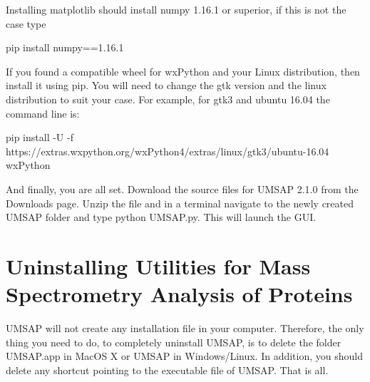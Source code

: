 Installing matplotlib should install numpy 1.16.1 or superior, if this is not the case type

pip install numpy==1.16.1

If you found a compatible wheel for wxPython and your Linux distribution, then install it using pip. You will need to change the gtk version and the linux distribution to suit your case. For example, for gtk3 and ubuntu 16.04 the command line is:

pip install -U -f https://extras.wxpython.org/wxPython4/extras/linux/gtk3/ubuntu-16.04 wxPython

And finally, you are all set. Download the source files for UMSAP \num[parse-numbers=false]{2.1.0} from the Downloads page. Unzip the file and in a terminal navigate to the newly created UMSAP folder and type python UMSAP.py. This will launch the GUI.

\section{Uninstalling Utilities for Mass Spectrometry Analysis of Proteins}

UMSAP will not create any installation file in your computer. Therefore, the only thing you need to do, to completely uninstall UMSAP, is to delete the folder UMSAP.app in MacOS X or UMSAP in Windows/Linux. In addition, you should delete any shortcut pointing to the executable file of UMSAP. That is all.  